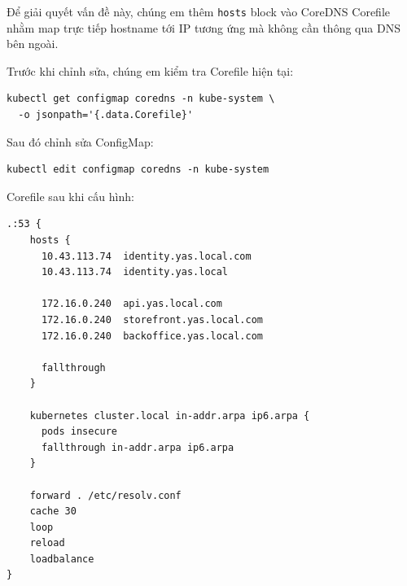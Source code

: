 Để giải quyết vấn đề này, chúng em thêm \texttt{hosts} block vào CoreDNS Corefile nhằm map trực tiếp hostname tới IP tương ứng mà không cần thông qua DNS bên ngoài.

Trước khi chỉnh sửa, chúng em kiểm tra Corefile hiện tại:

\begin{verbatim}
kubectl get configmap coredns -n kube-system \
  -o jsonpath='{.data.Corefile}'
\end{verbatim}

Sau đó chỉnh sửa ConfigMap:

\begin{verbatim}
kubectl edit configmap coredns -n kube-system
\end{verbatim}

Corefile sau khi cấu hình:

\begin{verbatim}
.:53 {
    hosts {
      10.43.113.74  identity.yas.local.com
      10.43.113.74  identity.yas.local

      172.16.0.240  api.yas.local.com
      172.16.0.240  storefront.yas.local.com
      172.16.0.240  backoffice.yas.local.com

      fallthrough
    }

    kubernetes cluster.local in-addr.arpa ip6.arpa {
      pods insecure
      fallthrough in-addr.arpa ip6.arpa
    }

    forward . /etc/resolv.conf
    cache 30
    loop
    reload
    loadbalance
}
\end{verbatim}

